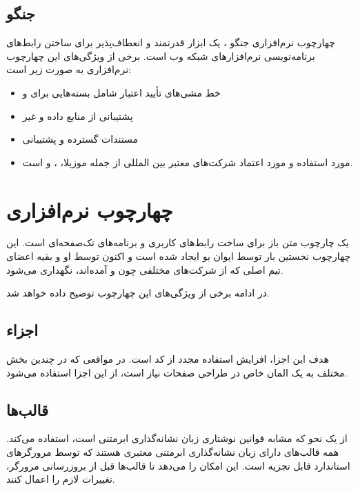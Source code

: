 {{\subsection{جنگو }
چهارچوب نرم‌افزاری جنگو \cite{DjangoREST}، یک ابزار قدرتمند و انعطاف‌پذیر برای ساختن رابط‌های برنامه‌نویسی نرم‌افزارهای شبکه وب است.
برخی از ویژگی‌های این چهارچوب نرم‌افزاری به صورت زیر است:
\begin{itemize}
	\item خط مشی‌های تأیید اعتبار شامل بسته‌هایی برای  و 
	\item پشتیبانی از منابع داده  و غیر 
	\item مستندات گسترده و پشتیبانی 
	\item مورد استفاده و مورد اعتماد شرکت‌های معتبر بین المللی از جمله موزیلا، ،  و  است.
\end{itemize}


\section{چهارچوب نرم‌افزاری }
\cite{Vue} یک چارچوب متن باز  برای ساخت رابط‌های کاربری و برنامه‌های تک‌صفحه‌ای است. این چهارچوب نخستین بار توسط ایوان یو ایجاد شده است و اکنون توسط او و بقیه اعضای تیم اصلی که از شرکت‌های مختلفی چون  و  آمده‌اند، نگهداری می‌شود.

در ادامه برخی از ویژگی‌های این چهارچوب توضیح داده خواهد شد.

\subsection{اجزاء}
هدف این اجزا، افزایش استفاده مجدد از کد است. در مواقعی که در چندین بخش مختلف به یک المان خاص در طراحی صفحات نیاز است، از این اجزا استفاده می‌شود.

\subsection{قالب‌ها}
 از یک نحو که مشابه قوانین نوشتاری زبان نشانه‌گذاری ابرمتنی است، استفاده می‌کند. همه قالب‌های  دارای زبان نشانه‌گذاری ابرمتنی معتبری هستند که توسط مرورگرهای استاندارد قابل تجزیه است.  این امکان را می‌دهد تا قالب‌ها قبل از بروزرسانی مرورگر، تغییرات لازم را اعمال کنند.

}}
